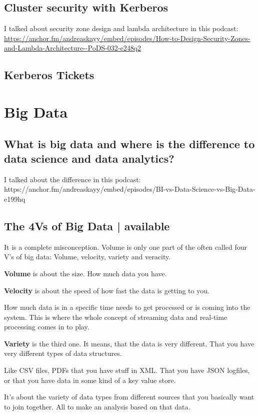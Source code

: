 \documentclass[12pt, numbers=noenddot]{scrreprt} %
\begin{document}
\section{Cluster security with Kerberos}

I talked about security zone design and lambda architecture in this podcast: \url{https://anchor.fm/andreaskayy/embed/episodes/How-to-Design-Security-Zones-and-Lambda-Architecture--PoDS-032-e248q2}

\section{Kerberos Tickets}


\chapter{Big Data}
\section{What is big data and where is the difference to data science and data analytics?}
I talked about the difference in this podcast: https://anchor.fm/andreaskayy/embed/episodes/BI-vs-Data-Science-vs-Big-Data-e199hq

\section{The 4Vs of Big Data | available}

It is a complete misconception. Volume is only one part of the often called four V’s of big data: Volume, velocity, variety and veracity.

\textbf{Volume} is about the size. How much data you have.

\textbf{Velocity} is about the speed of how fast the data is getting to you.

How much data is in a specific time needs to get processed or is coming into the system. This is where the whole concept of streaming data and real-time processing comes in to play.

\textbf{Variety} is the third one. It means, that the data is very different. That you have very different types of data structures.

Like CSV files, PDFs that you have stuff in XML. That you have JSON logfiles, or that you have data in some kind of a key value store.

It’s about the variety of data types from different sources that you basically want to join together. All to make an analysis based on that data.
\end{document}
